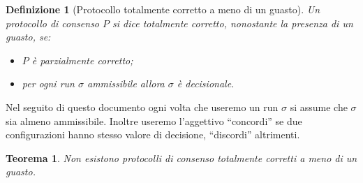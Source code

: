 \documentclass{article}
\newtheorem{definizione}{Definizione}
\newtheorem{teorema}{Teorema}
\begin{document}
\begin{definizione}[Protocollo totalmente corretto a meno di un guasto]
  Un protocollo di consenso $P$ si dice \emph{totalmente corretto},
  nonostante la presenza di un guasto, se:
\begin{itemize}
\item  $P$ è parzialmente corretto;
\item per ogni run $\sigma$ ammissibile allora $\sigma$ \`e decisionale.
\end{itemize}
\end{definizione}

Nel seguito di questo documento ogni volta che useremo un run $\sigma$
si assume che $\sigma$ sia almeno ammissibile. Inoltre useremo
l'aggettivo ``concordi'' se due configurazioni hanno stesso valore di
decisione, ``discordi'' altrimenti.

\begin{teorema}
Non esistono protocolli di consenso totalmente corretti a meno di un guasto.
\end{teorema}
\end{document}
